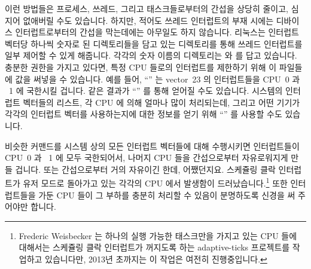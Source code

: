 이런 방법들은 프로세스, 쓰레드, 그리고 태스크들로부터의 간섭을 상당히 줄이고,
심지어 없애버릴 수도 있습니다.
하지만, 적어도 쓰레드 인터럽트의 부재 시에는 디바이스 인터럽트로부터의 간섭을
막는데에는 아무일도 하지 않습니다.
리눅스는 인터럽트 벡터당 하나씩 숫자로 된 디렉토리들을 담고 있는
 디렉토리를 통해 쓰레드 인터럽트를 일부 제어할 수 있게
해줍니다.
각각의 숫자 이름의 디렉토리는  와  를
답고 있습니다.
충분한 권한을 가지고 있다면, 특정 CPU 들로의 인터럽트를 제한하기 위해 이
파일들에 값을 써넣을 수 있습니다.
예를 들어, ``'' 는 vector~23 의
인터럽트들을 CPU~0 과 ~1 에 국한시킬 겁니다.
같은 결과가 ``'' 를 통해
얻어질 수도 있습니다.
시스템의 인터럽트 벡터들의 리스트, 각 CPU 에 의해 얼마나 많이 처리되는데,
그리고 어떤 기기가 각각의 인터럽트 벡터를 사용하는지에 대한 정보를 얻기 위해
``'' 를 사용할 수도 있습니다.

비슷한 커맨드를 시스템 상의 모든 인터럽트 벡터들에 대해 수행시키면 인터럽트들이
CPU~0 과 ~1 에 모두 국한되어서, 나머지 CPU 들을 간섭으로부터 자유로워지게 만들
겁니다.
또는 간섭으로부터 거의 자유이긴 한데, 어쨌던지요.
스케쥴링 클락 인터럽트가 유저 모드로 돌아가고 있는 각각의 CPU 에서 발생함이
드러났습니다.\footnote{
	Frederic Weisbecker 는 하나의 실행 가능한 태스크만을 가지고 있는 CPU
	들에 대해서는 스케쥴링 클락 인터럽트가 꺼지도록 하는 adaptive-ticks
	프로젝트를 작업하고 있습니다만, 2013년 초까지는 이 작업은 여전히
	진행중입니다.
}
또한 인터럽트들을 가둔 CPU 들이 그 부하를 충분히 처리할 수 있음이 분명하도록
신경을 써 주어야만 합니다.
\iffalse

